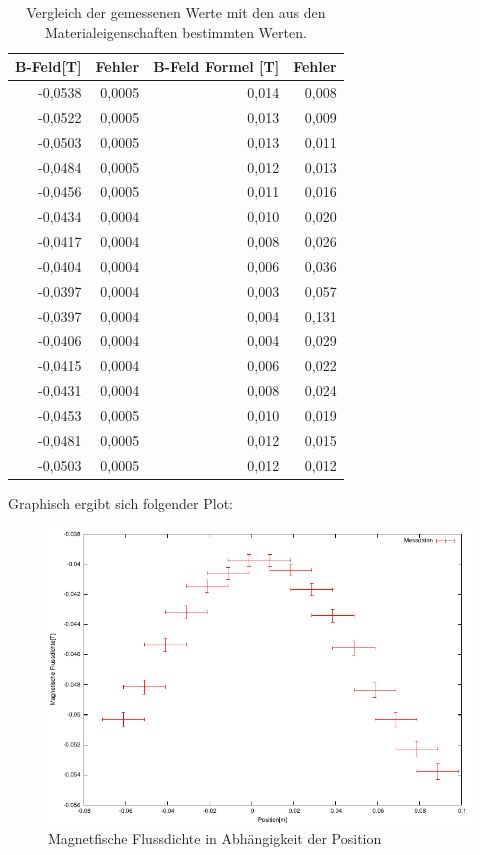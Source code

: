 \documentclass[12pt]{scrartcl}
\begin{document}
\begin{table}[htbp]
\caption{Vergleich der gemessenen Werte mit den aus den Materialeigenschaften bestimmten Werten.}
\begin{center}
\begin{tabular}{|r|r|r|r|}
\hline
\multicolumn{1}{|l|}{B-Feld[T]} & Fehler & \multicolumn{1}{l|}{B-Feld Formel [T]} & \multicolumn{1}{l|}{Fehler} \\ \hline
-0,0538 & 0,0005 & 0,014 & 0,008 \\ \hline
-0,0522 & 0,0005 & 0,013 & 0,009 \\ \hline
-0,0503 & 0,0005 & 0,013 & 0,011 \\ \hline
-0,0484 & 0,0005 & 0,012 & 0,013 \\ \hline
-0,0456 & 0,0005 & 0,011 & 0,016 \\ \hline
-0,0434 & 0,0004 & 0,010 & 0,020 \\ \hline
-0,0417 & 0,0004 & 0,008 & 0,026 \\ \hline
-0,0404 & 0,0004 & 0,006 & 0,036 \\ \hline
-0,0397 & 0,0004 & 0,003 & 0,057 \\ \hline
-0,0397 & 0,0004 & 0,004 & 0,131 \\ \hline
-0,0406 & 0,0004 & 0,004 & 0,029 \\ \hline
-0,0415 & 0,0004 & 0,006 & 0,022 \\ \hline
-0,0431 & 0,0004 & 0,008 & 0,024 \\ \hline
-0,0453 & 0,0005 & 0,010 & 0,019 \\ \hline
-0,0481 & 0,0005 & 0,012 & 0,015 \\ \hline
-0,0503 & 0,0005 & 0,012 & 0,012 \\ \hline
\end{tabular}
\end{center}
\label{aufgabe_4}
\end{table}

\newpage

Graphisch ergibt sich folgender Plot:

\begin{figure}[htbp] 
  \centering
    \includegraphics[scale = 1.3]{aufgabe_4.pdf}
  	\caption[Magnetfische Flussdichte in Abhängigkeit der Position]{Magnetfische Flussdichte in Abhängigkeit der Position}
  \label{fig:fluss_pos}
\end{figure}
\end{document}
